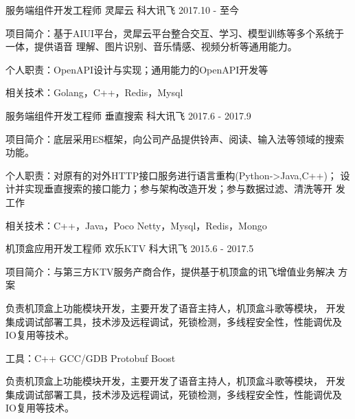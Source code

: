 

\begin{cventries}

  \cventry
    {服务端组件开发工程师} %
    {灵犀云} %
    {科大讯飞} %
    {2017.10 - 至今} %
    {
      \begin{cvitems}
      \item {项目简介：基于AIUI平台，灵犀云平台整合交互、学习、模型训练等多个系统于一体，提供语音
          理解、图片识别、音乐情感、视频分析等通用能力。}
      \item {个人职责：OpenAPI设计与实现；通用能力的OpenAPI开发等}
      \item {相关技术：Golang，C++，Redis，Mysql}
      \end{cvitems}
    }

  \cventry
    {服务端组件开发工程师} %
    {垂直搜索} %
    {科大讯飞} %
    {2017.6 - 2017.9} %
    {
      \begin{cvitems} %
      \item {项目简介：底层采用ES框架，向公司产品提供铃声、阅读、输入法等领域的搜索功能。}
      \item {个人职责：对原有的对外HTTP接口服务进行语言重构(Python->Java,C++)；
          设计并实现垂直搜索的接口能力；参与架构改造开发；参与数据过滤、清洗等开
          发工作}
      \item {相关技术：C++，Java，Poco Netty，Mysql，Redis，Mongo}
      \end{cvitems}
    }

  \cventry
    {机顶盒应用开发工程师} %
    {欢乐KTV} %
    {科大讯飞} %
    {2015.6 - 2017.5} %
    {
      \begin{cvitems} %
      \item {项目简介：与第三方KTV服务产商合作，提供基于机顶盒的讯飞增值业务解决
          方案}
      \item {负责机顶盒上功能模块开发，主要开发了语音主持人，机顶盒斗歌等模块，
            开发集成调试部署工具，技术涉及远程调试，死锁检测，多线程安全性，性能调优及IO复用等技术。}
      \item {工具：C++ \textbullet{} GCC/GDB \textbullet{} Protobuf
          \textbullet{} Boost}
      \item {负责机顶盒上功能模块开发，主要开发了语音主持人，机顶盒斗歌等模块，
            开发集成调试部署工具，技术涉及远程调试，死锁检测，多线程安全性，性能调优及IO复用等技术。}
      \end{cvitems}
    }

\end{cventries}
